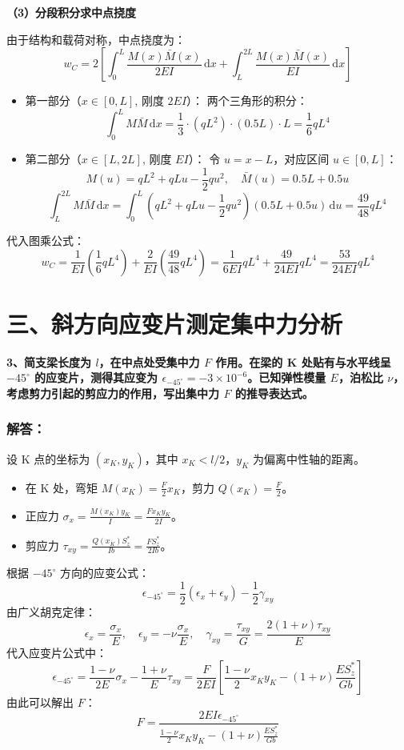 \documentclass[UTF8,fontset=windows]{ctexart}
\newcommand{\diff}{\,\mathrm{d}}
\begin{document}
\textbf{（3）分段积分求中点挠度}

由于结构和载荷对称，中点挠度为：
\[
    w_C = 2 \left[ \int_{0}^{L} \frac{M(x) \bar{M}(x)}{2EI} \diff x + \int_{L}^{2L} \frac{M(x) \bar{M}(x)}{EI} \diff x \right]
\]
\begin{itemize}
    \item 第一部分（$x \in [0, L]$, 刚度 $2EI$）：
    两个三角形的积分：
    \[
        \int_{0}^{L} M \bar{M} \diff x = \frac{1}{3} \cdot (qL^2) \cdot (0.5L) \cdot L = \frac{1}{6} qL^4
    \]
    \item 第二部分（$x \in [L, 2L]$, 刚度 $EI$）：
    令 $u = x - L$，对应区间 $u \in [0, L]$：
    \[
        M(u) = qL^2 + qL u - \frac{1}{2}q u^2, \quad \bar{M}(u) = 0.5L + 0.5 u
    \]
    \[
        \int_{L}^{2L} M \bar{M} \diff x = \int_{0}^{L} \left(qL^2 + qLu - \frac{1}{2}qu^2\right) \left(0.5L + 0.5u\right) \diff u = \frac{49}{48} qL^4
    \]
\end{itemize}
代入图乘公式：
\[
    w_C = \frac{1}{EI} \left( \frac{1}{6} qL^4 \right) + \frac{2}{EI} \left( \frac{49}{48} qL^4 \right) = \frac{1}{6EI} qL^4 + \frac{49}{24EI} qL^4 = \frac{53}{24EI} qL^4
\]

\newpage

\section*{三、斜方向应变片测定集中力分析}

\textbf{3、简支梁长度为 $l$，在中点处受集中力 $F$ 作用。在梁的 K 处贴有与水平线呈 $-45^\circ$ 的应变片，测得其应变为 $\epsilon_{-45^\circ} = -3 \times 10^{-6}$。已知弹性模量 $E$，泊松比 $\nu$，考虑剪力引起的剪应力的作用，写出集中力 $F$ 的推导表达式。}

\subsubsection*{解答：}

设 K 点的坐标为 $(x_K, y_K)$，其中 $x_K < l/2$，$y_K$ 为偏离中性轴的距离。
\begin{itemize}
    \item 在 K 处，弯矩 $M(x_K) = \frac{F}{2} x_K$，剪力 $Q(x_K) = \frac{F}{2}$。
    \item 正应力 $\sigma_x = \frac{M(x_K) y_K}{I} = \frac{F x_K y_K}{2I}$。
    \item 剪应力 $\tau_{xy} = \frac{Q(x_K) S_z^*}{Ib} = \frac{F S_z^*}{2Ib}$。
\end{itemize}
根据 $-45^\circ$ 方向的应变公式：
\[
    \epsilon_{-45^\circ} = \frac{1}{2}(\epsilon_x + \epsilon_y) - \frac{1}{2}\gamma_{xy}
\]
由广义胡克定律：
\[
    \epsilon_x = \frac{\sigma_x}{E}, \quad \epsilon_y = -\nu \frac{\sigma_x}{E}, \quad \gamma_{xy} = \frac{\tau_{xy}}{G} = \frac{2(1+\nu)\tau_{xy}}{E}
\]
代入应变片公式中：
\[
    \epsilon_{-45^\circ} = \frac{1-\nu}{2E}\sigma_x - \frac{1+\nu}{E}\tau_{xy} = \frac{F}{2EI} \left[ \frac{1-\nu}{2} x_K y_K - (1+\nu)\frac{E S_z^*}{G b} \right]
\]
由此可以解出 $F$：
\[
    F = \frac{2 E I \epsilon_{-45^\circ}}{\frac{1-\nu}{2} x_K y_K - (1+\nu)\frac{E S_z^*}{G b}}
\]
\end{document}
